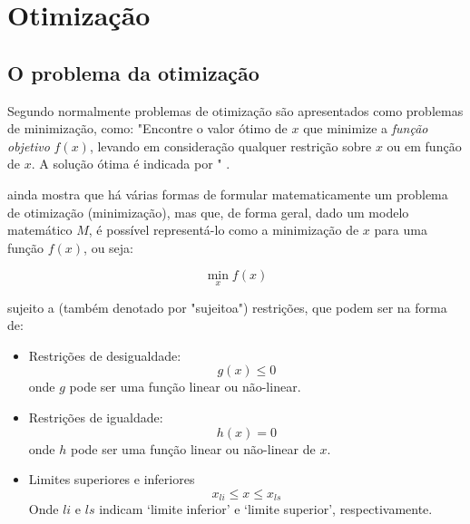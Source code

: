 
\chapter{Otimização}
\label{ch:otimizacao}

\section{O problema da otimização}
\label{sec:problema_da_otimizacao}

Segundo  normalmente problemas de otimização são apresentados
como problemas de minimização, como: "Encontre o valor ótimo de $x$ que minimize a
\textit{função objetivo} $f(x)$, levando em consideração qualquer restrição sobre $x$
ou em função de $x$. A solução ótima é indicada por
" \cite{Haugen2018}.

 ainda mostra que há várias formas de formular matematicamente
um problema de otimização (minimização), mas que, de forma geral, dado um modelo
matemático $M$, é possível representá-lo como a minimização de $x$ para uma função
$f(x)$, ou seja:

\begin{equation}
	\min_{x} f(x)
\end{equation}

sujeito a (também denotado por "\acrshort{sujeitoa}") restrições, que podem ser na forma de:

\begin{itemize}
\item Restrições de desigualdade:
	\begin{equation}
		\label{eq:min_restr_desigualdade}
		g(x) \leq 0
	\end{equation}
	onde $g$ pode ser uma função linear ou não-linear.
	
\item Restrições de igualdade:
	\begin{equation}
		\label{eq:min_restr_igualdade}
		h(x) = 0
	\end{equation}
	onde $h$ pode ser uma função linear ou não-linear de $x$.
	
\item Limites superiores e inferiores
	\begin{equation}
		\label{eq:min_limites}
		x_{li} \leq x \leq x_{ls}
	\end{equation}
	Onde $li$ e $ls$ indicam `limite inferior' e `limite superior', respectivamente.
\end{itemize}


